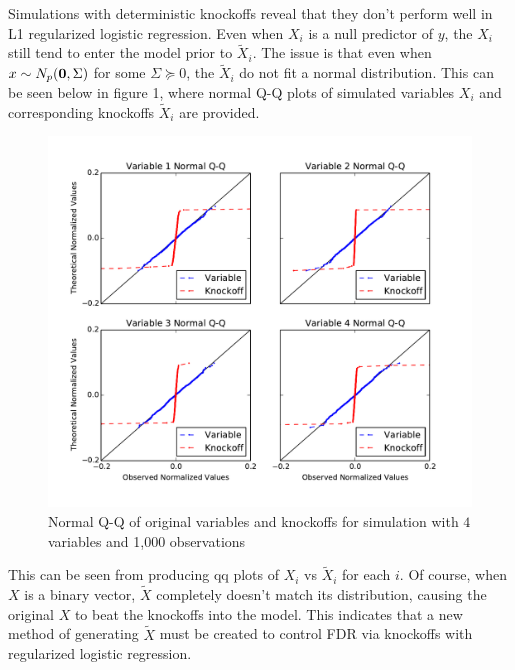 \documentclass[11pt]{article}
\theoremstyle{definition}
\begin{document}
     
    Simulations with deterministic knockoffs reveal that they don't perform well in L1 regularized logistic regression. Even when $X_i$ is a null predictor of $y$, the $X_i$ still tend to enter the model prior to $\tilde X_i$. The issue is that even when $x\sim N_p({\bf 0}, \Sigma)$ for some $\Sigma\succeq 0$, the $\tilde X_i$ do not fit a normal distribution. This can be seen below in figure 1, where normal Q-Q plots of simulated variables $X_i$ and corresponding knockoffs $\tilde X_i$ are provided.
    \begin{figure}[h!]
        \includegraphics[width=20cm]{images/normalQQ}
        \caption{Normal Q-Q of original variables and knockoffs for simulation with $4$ variables and 1,000 observations}
    \end{figure}
    
    This can be seen from producing qq plots of $X_i$ vs $\tilde X_i$ for each $i$. Of course, when $X$ is a binary vector, $\tilde X$ completely doesn't match its distribution, causing the original $X$ to beat the knockoffs into the model. This indicates that a new method of generating $\tilde X$ must be created to control FDR via knockoffs with regularized logistic regression. 
\end{document}
